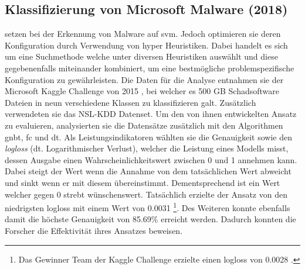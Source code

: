 \documentclass[
    12pt, %
    DIV10,
    ngerman, %
    a4paper, %
    oneside, %
    titlepage, %
    parskip=half, %
    headings=normal, %
    listof=totoc, %
    bibliography=totoc, %
    index=totoc, %
    captions=tableheading, %
    final %
]{scrreprt}
\begin{document}
\subsection{Klassifizierung von Microsoft Malware (2018)}\label{sabar}
\textcite{Sabar2018} setzen bei der Erkennung von Malware auf \ac{svm}. Jedoch optimieren sie deren Konfiguration durch Verwendung von hyper Heuristiken. Dabei handelt es sich um eine Suchmethode welche unter diversen Heuristiken auswählt und diese gegebenenfalls miteinander kombiniert, um eine bestmögliche problemspezifische Konfiguration zu gewährleisten. Die Daten für die Analyse entnahmen sie der Microsoft Kaggle Challenge von 2015 \parencite{Kaggle}, bei welcher es 500 GB Schadsoftware Dateien in neun verschiedene Klassen zu klassifizieren galt. Zusätzlich verwendeten sie das NSL-KDD Datenset. Um den von ihnen entwickelten Ansatz zu evaluieren, analysierten sie die Datensätze zusätzlich mit den Algorithmen \ac{gnbt}, \ac{fc} und \ac{dt}. Als Leistungsindikatoren wählten sie die Genauigkeit sowie den \emph{logloss} (dt. Logarithmischer Verlust), welcher die Leistung eines Modells misst, dessen Ausgabe einen Wahrscheinlichkeitswert zwischen 0 und 1 annehmen kann. Dabei steigt der Wert wenn die Annahme von dem tatsächlichen Wert abweicht und sinkt wenn er mit diesem übereinstimmt. Dementsprechend ist ein Wert welcher gegen 0 strebt wünschenswert. Tatsächlich erzielte der Ansatz von \textcite{Sabar2018} den niedrigsten logloss mit einem Wert von 0.0031 \footnote{Das Gewinner Team der Kaggle Challenge erzielte einen logloss von 0.0028 \parencite{leader}.}. Des Weiteren konnte ebenfalls damit die höchste Genauigkeit von 85.69\% erreicht werden. Dadurch konnten die Forscher die Effektivität ihres Ansatzes beweisen.
%
\end{document}
